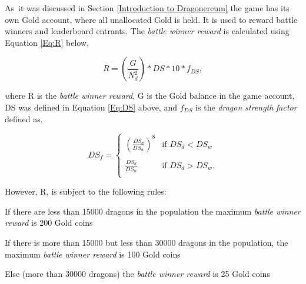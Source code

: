 \documentclass[12pt]{article}
\begin{document}
{As\ it was discussed in  Section \ref{Introduction to Dragonereum}  the game has its own Gold account, where all unallocated Gold is held. It is used to reward battle winners and leaderboard entrants. The \textit{battle winner reward} is calculated using   Equation \ref{Eq:R}  below,\par


\begin{center}
  \begin{equation}\label{Eq:R}
    R=\left(\frac{G}{N_d^2}\right)*DS*10*f_{DS},
  \end{equation}
\end{center}

\vspace{\baselineskip}
\textit{w}here R is the \textit{battle winner reward}, G is the Gold balance in the game account, DS was defined in Equation \ref{Eq:DS} above, and $f_{DS}$ is the \textit{dragon strength} \textit{factor} defined as,\par


\begin{center}
  \begin{equation}
   DS_f=\begin{cases}
     \left(\frac{DS_{d}}{DS_{w}}\right)^8 & \mbox{if }  DS_{d} < DS_{w}\\
     \\
     \frac{DS_{d}}{DS_{w}} & \mbox{if } DS_{d}>DS_{w}.\\
    \end{cases}
  \end{equation}
\end{center}

\vspace{\baselineskip}
However, R, is subject to the following rules:\par

\begin{itemize}
  \begin{samepage}
	\item If there are less than 15000 dragons in the population the maximum \textit{battle winner reward} is 200 Gold coins\par

	\item If there is more than 15000 but less than 30000 dragons in the population, the maximum \textit{battle winner reward} is 100 Gold coins\par

	\item Else (more than 30000 dragons) the \textit{battle winner reward} is 25 Gold coins
  \end{samepage}
\end{itemize}\par

}
\end{document}
